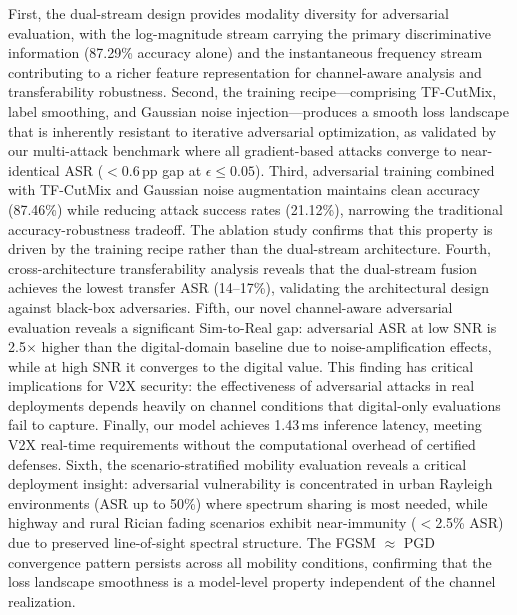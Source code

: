 \documentclass[conference]{IEEEtran}
\begin{document}
First, the dual-stream design provides modality diversity for adversarial evaluation, with the log-magnitude stream carrying the primary discriminative information (87.29\% accuracy alone) and the instantaneous frequency stream contributing to a richer feature representation for channel-aware analysis and transferability robustness. Second, the training recipe---comprising TF-CutMix, label smoothing, and Gaussian noise injection---produces a smooth loss landscape that is inherently resistant to iterative adversarial optimization, as validated by our multi-attack benchmark where all gradient-based attacks converge to near-identical ASR ($<$0.6\,pp gap at $\epsilon \leq 0.05$). Third, adversarial training combined with TF-CutMix and Gaussian noise augmentation maintains clean accuracy (87.46\%) while reducing attack success rates (21.12\%), narrowing the traditional accuracy-robustness tradeoff. The ablation study confirms that this property is driven by the training recipe rather than the dual-stream architecture. Fourth, cross-architecture transferability analysis reveals that the dual-stream fusion achieves the lowest transfer ASR (14--17\%), validating the architectural design against black-box adversaries. Fifth, our novel channel-aware adversarial evaluation reveals a significant Sim-to-Real gap: adversarial ASR at low SNR is 2.5$\times$ higher than the digital-domain baseline due to noise-amplification effects, while at high SNR it converges to the digital value. This finding has critical implications for V2X security: the effectiveness of adversarial attacks in real deployments depends heavily on channel conditions that digital-only evaluations fail to capture. Finally, our model achieves 1.43\,ms inference latency, meeting V2X real-time requirements without the computational overhead of certified defenses. Sixth, the scenario-stratified mobility evaluation reveals a critical deployment insight: adversarial vulnerability is concentrated in urban Rayleigh environments (ASR up to 50\%) where spectrum sharing is most needed, while highway and rural Rician fading scenarios exhibit near-immunity ($<$2.5\% ASR) due to preserved line-of-sight spectral structure. The FGSM $\approx$ PGD convergence pattern persists across all mobility conditions, confirming that the loss landscape smoothness is a model-level property independent of the channel realization.
\end{document}
